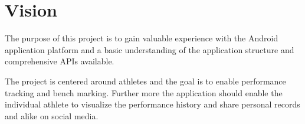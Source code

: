 \chapter{Vision}
The purpose of this project is to gain valuable experience with the Android application platform and a basic understanding of the application structure and comprehensive APIs available.

The project is centered around athletes and the goal is to enable performance tracking and bench marking. Further more the application should enable the individual athlete to visualize the performance history and share personal records and alike on social media.
